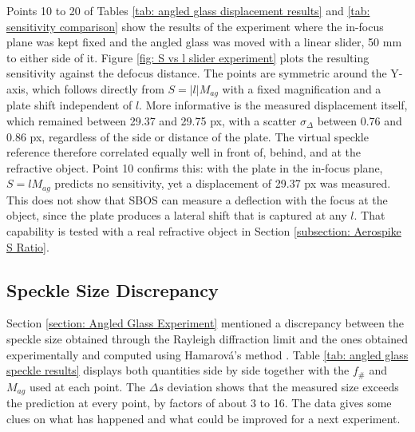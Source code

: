 Points 10 to 20 of Tables \ref{tab: angled glass displacement results} and \ref{tab: sensitivity comparison} show the results of the experiment where the in-focus plane was kept fixed and the angled glass was moved with a linear slider, 50 mm to either side of it. Figure \ref{fig: S vs l slider experiment} plots the resulting sensitivity against the defocus distance. The points are symmetric around the Y-axis, which follows directly from $S = |l| M_{ag}$ with a fixed magnification and a plate shift independent of $l$. More informative is the measured displacement itself, which remained between 29.37 and 29.75 px, with a scatter $\sigma_\Delta$ between 0.76 and 0.86 px, regardless of the side or distance of the plate. The virtual speckle reference therefore correlated equally well in front of, behind, and at the refractive object. Point 10 confirms this: with the plate in the in-focus plane, $S = l M_{ag}$ predicts no sensitivity, yet a displacement of 29.37 px was measured. This does not show that SBOS can measure a deflection with the focus at the object, since the plate produces a lateral shift that is captured at any $l$. That capability is tested with a real refractive object in Section \ref{subsection: Aerospike S Ratio}.

\subsection{Speckle Size Discrepancy}
\label{subsection: Angled Glass Speckle Size}

Section \ref{section: Angled Glass Experiment} mentioned a discrepancy between the speckle size obtained through the Rayleigh diffraction limit and the ones obtained experimentally and computed using Hamarová's method \cite{Hamarova2016}. Table \ref{tab: angled glass speckle results} displays both quantities side by side together with the $f_\#$ and $M_{ag}$ used at each point. The $\Delta s$ deviation shows that the measured size exceeds the prediction at every point, by factors of about 3 to 16. The data gives some clues on what has happened and what could be improved for a next experiment.

